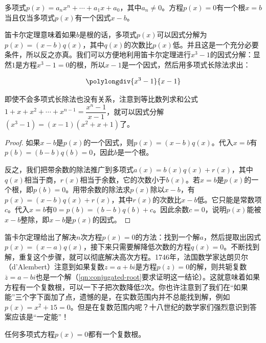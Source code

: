 \documentclass[b5paper]{ctexart}
\begin{document}
\begin{theorem}[笛卡尔]
多项式$p(x) = a_nx^n + \dotsb + a_1x + a_0$，其中$a_n \ne 0$。方程$p(x) = 0$有一个根$x = b$当且仅当多项式$p(x)$有一个因式$x - b$。
\end{theorem}

笛卡尔定理意味着如果$b$是根的话，多项式$p(x)$可以因式分解为$p(x) = (x - b)q(x)$，其中$q(x)$的次数比$p(x)$低。并且这是一个充分必要条件，所以反之亦真。我们可以方便地利用笛卡尔定理进行$x^3 - 1$的因式分解：显然$1$是方程$x^3 - 1 = 0$的根，所以$x - 1$是一个因式，然后用多项式长除法求出：

\[
\polylongdiv{x^3-1}{x-1}
\]

即使不会多项式长除法也没有关系，注意到等比数列求和公式$1 + x + x^2 + \dotsb + x^{n-1} = \dfrac{x^n - 1}{x - 1}$，就可以因式分解$(x^3 - 1) = (x - 1)(x^2 + x + 1)$了。

\begin{proof}
如果$x - b$是$p(x)$的一个因式，则$p(x) = (x - b)q(x)$。代入$x = b$有$p(b) = (b - b)q(b) = 0$，因此$b$是一个根。

反之，我们把带余数的除法推广到多项式$a(x) = b(x)q(x) + r(x)$，其中$q(x)$相当于商，$r(x)$相当于余数，它的次数小于$b(x)$。若$x = b$是$p(x)$的一个根，即$p(b) = 0$。用带余数的除法求$p(x)$除以$x - b$，有$p(x) = (x - b)q(x) + r(x)$，其中$r(x)$的次数比$x - b$低。它只能是常数项$c$。代入$x = b$有$0 = p(b) = (b - b)q(b) + c$。因此余数$c = 0$，说明$p(x)$能被$x - b$整除，即$x - b$是$p(x)$的因式。
\end{proof}

笛卡尔定理给出了解决$n$次方程$p(x) = 0$的方法：找到一个解$a$，然后提取出因式$p(x) = (x - a)q(x)$，接下来只需要解降低次数的方程$q(x) = 0$。不断找到解，重复这个步骤，就可以彻底解决高次方程。1746年，法国数学家达朗贝尔（d'Alembert）注意到如果复数$z = a + bi$是方程$p(z) = 0$的解，则共轭复数$\overline{z} = a - bi$也是一个解（\cref{qn:conjugated-root}要求证明这一结论）。这就意味着如果方程有一个复数根，可以一下子把次数降低2次。你也许注意到了我们在“如果能”三个字下面加了点，遗憾的是，在实数范围内并不总能找到解，例如$p(x) = x^2 + 15 = 0$。但是在复数范围内呢？十八世纪的数学家们强烈意识到答案应该是“一定能”！

\begin{theorem}[代数基本定理]
任何多项式方程$p(x) = 0$都有一个复数根。
\end{theorem}
\end{document}
